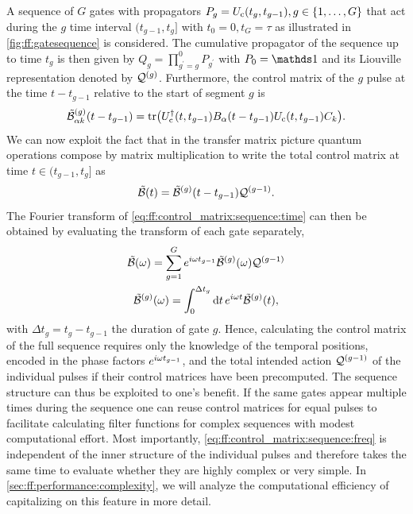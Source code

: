 A sequence of $G$ gates with propagators $P_g = U_{\mathrm{c}}(t_g, t_{g-1}), g\in\lbrace 1,\dotsc,G\rbrace$ that act during the $g$ time interval $(t_{g-1}, t_g]$ with $t_0 =  0, t_G = \tau$ as illustrated in \cref{fig:ff:gatesequence} is considered.
The cumulative propagator of the sequence up to time $t_g$ is then given by $Q_g = \prod_{g^\prime=g}^0 P_{g^\prime}$ with $P_0 = \eye$ and its Liouville representation denoted by $\mathcal{Q}^{(g)}$.
Furthermore, the control matrix of the $g$ pulse at the time $t - t_{g-1}$ relative to the start of segment $g$ is
\begin{equation}\label{eq:ff:control_matrix:pulse:time}
\tilde{\mathcal{B}}^{(g)}_{\alpha k}(t - t_{g-1}) = \tr(U_{\mathrm{c}}^\dagger(t, t_{g-1})B_\alpha(t - t_{g-1}) U_{\mathrm{c}}(t, t_{g-1}) C_k).
\end{equation}
We can now exploit the fact that in the transfer matrix picture quantum operations compose by matrix multiplication to write the total control matrix at time $t\in (t_{g-1}, t_g]$ as
\begin{equation}\label{eq:ff:control_matrix:sequence:time}
\tilde{\mathcal{B}}(t) = \tilde{\mathcal{B}}^{(g)}(t - t_{g-1})\mathcal{Q}^{(g-1)}.
\end{equation}
The Fourier transform of \cref{eq:ff:control_matrix:sequence:time} can then be obtained by evaluating the transform of each gate separately,
\begin{gather}
    \tilde{\mathcal{B}}(\omega) = \sum_{g = 1}^G e^{i\omega t_{g-1}}\tilde{\mathcal{B}}^{(g)}(\omega)\mathcal{Q}^{(g-1)} \label{eq:ff:control_matrix:sequence:freq}\\
    \tilde{\mathcal{B}}^{(g)}(\omega) = \int_0^{\Delta t_g}\dd{t}e^{i\omega t}\tilde{\mathcal{B}}^{(g)}(t), \label{eq:ff:control_matrix:pulse:freq}
\end{gather}
with $\Delta t_g = t_g - t_{g-1}$ the duration of gate $g$.
Hence, calculating the control matrix of the full sequence requires only the knowledge of the temporal positions, encoded in the phase factors $e^{i\omega t_{g-1}}$, and the total intended action $\mathcal{Q}^{(g-1)}$ of the individual pulses if their control matrices have been precomputed.
The sequence structure can thus be exploited to one's benefit.
If the same gates appear multiple times during the sequence one can reuse control matrices for equal pulses to facilitate calculating filter functions for complex sequences with modest computational effort.
Most importantly, \cref{eq:ff:control_matrix:sequence:freq} is independent of the inner structure of the individual pulses and therefore takes the same time to evaluate whether they are highly complex or very simple.
In \cref{sec:ff:performance:complexity}, we will analyze the computational efficiency of capitalizing on this feature in more detail.

